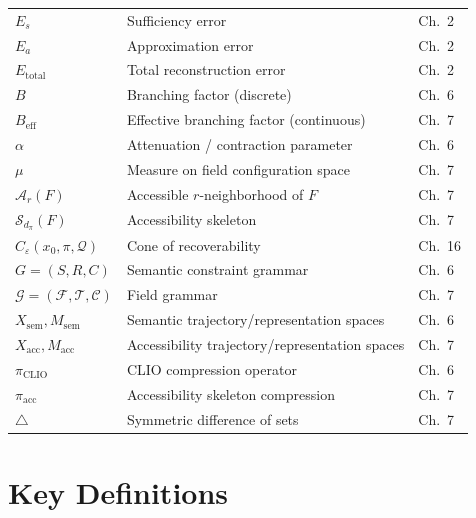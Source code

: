 \begin{center}
\begin{tabular}{lll}
$E_s$ & Sufficiency error & Ch.~2 \\
$E_a$ & Approximation error & Ch.~2 \\
$E_{\mathrm{total}}$ & Total reconstruction error & Ch.~2 \\
$B$ & Branching factor (discrete) & Ch.~6 \\
$B_{\mathrm{eff}}$ & Effective branching factor (continuous) & Ch.~7 \\
$\alpha$ & Attenuation / contraction parameter & Ch.~6 \\
$\mu$ & Measure on field configuration space & Ch.~7 \\
$\mathcal{A}_r(F)$ & Accessible $r$-neighborhood of $F$ & Ch.~7 \\
$\mathcal{S}_{d_\pi}(F)$ & Accessibility skeleton & Ch.~7 \\
$C_\varepsilon(x_0,\pi,\mathcal{Q})$ & Cone of recoverability & Ch.~16 \\
$G = (S,R,C)$ & Semantic constraint grammar & Ch.~6 \\
$\mathcal{G} = (\mathcal{F},\mathcal{T},\mathcal{C})$ & Field grammar & Ch.~7 \\
$X_{\mathrm{sem}}, M_{\mathrm{sem}}$ & Semantic trajectory/representation spaces & Ch.~6 \\
$X_{\mathrm{acc}}, M_{\mathrm{acc}}$ & Accessibility trajectory/representation spaces & Ch.~7 \\
$\pi_{\mathrm{CLIO}}$ & CLIO compression operator & Ch.~6 \\
$\pi_{\mathrm{acc}}$ & Accessibility skeleton compression & Ch.~7 \\
$\triangle$ & Symmetric difference of sets & Ch.~7 \\
\bottomrule
\end{tabular}
\end{center}

\section{Key Definitions}

